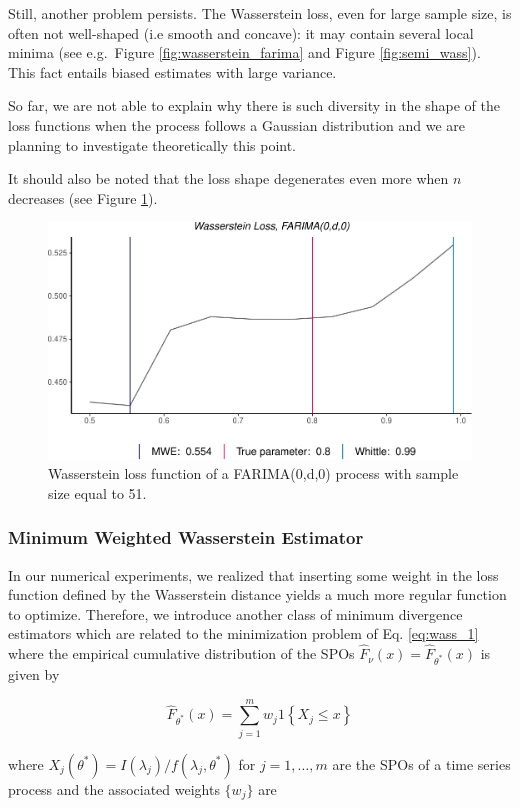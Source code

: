 \documentclass[
  11pt,
]{article}
\begin{document}
Still, another problem persists. The Wasserstein loss, even for large
sample size, is often not well-shaped (i.e smooth and concave): it may
contain several local minima (see e.g.~Figure
\ref{fig:wasserstein_farima} and Figure \ref{fig:semi_wass}). This fact
entails biased estimates with large variance. 

So far, we are not able to explain why
there is such diversity in the shape of the loss functions when the process follows a Gaussian distribution and we are
planning to investigate theoretically this point.

It should also be noted
that the loss shape degenerates even more when \(n\) decreases (see
Figure \ref{fig:small_sample}). 

\begin{figure}

{\centering \includegraphics[width=0.5\linewidth]{Master_thesis_V5_files/figure-latex/small_sample-1} 

}

\caption{Wasserstein loss function of a FARIMA(0,d,0) process with sample size equal to 51.}\label{fig:small_sample}
\end{figure}

\hypertarget{minimum-weighted-wasserstein-estimator}{%
\subsubsection{Minimum Weighted Wasserstein
Estimator}\label{minimum-weighted-wasserstein-estimator}}

In our numerical experiments, we realized that inserting some weight in
the loss function defined by the Wasserstein distance yields a much more
regular function to optimize. Therefore, we introduce another class of
minimum divergence estimators which are related to the minimization
problem of Eq. \ref{eq:wass_1} where the empirical cumulative
distribution of the SPOs \(\hat F_\nu(x) = \hat F_{\theta^*}(x)\) is
given by

\[\hat F_{\theta^*}(x)=\sum_{j=1}^{m} w_{j} 1\left\{X_{j} \leq x\right\}\]

where
\(X_{j}\left(\theta^{*}\right)=I\left(\lambda_{j}\right) / f\left(\lambda_{j}, \theta^{*}\right)\)
for \(j=1, \ldots, m\) are the SPOs of a time series process and the
associated weights \(\{w_j\}\) are
\end{document}
